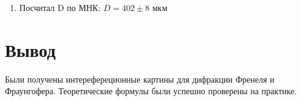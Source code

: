 \begin{enumerate}
    \item Посчитал D по МНК: $D = 402\pm8$ мкм

\end{enumerate}

\newpage

\section{Вывод}

Были получены интерефереционные картины для дифракции Френеля и Фраунгофера.
Теоретические формулы были успешно проверены на практике.